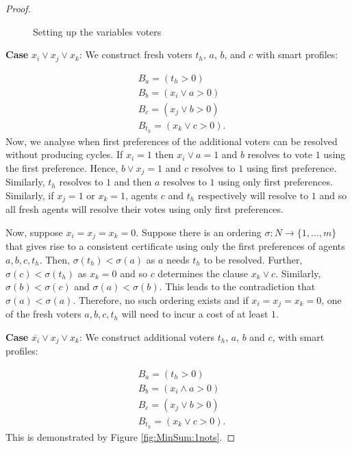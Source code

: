 \documentclass[11pt,a4paper, titlepage]{article}
\theoremstyle{definition}
\begin{document}
\begin{proof}
\begin{figure}
{
    }
    \caption{Setting up the variables voters}
    \label{fig:votes}
\end{figure}

\textbf{Case} $x_i \lor x_j \lor x_k$: We construct fresh voters $t_h$, $a$, $b$, and $c$ with smart profiles:

\begin{align*}
    &B_a = (t_h > 0) \\
    &B_b = (x_i \lor a > 0) \\
    &B_c = (x_j \lor b > 0) \\
    &B_{t_h} = (x_k \lor c > 0).
\end{align*}
Now, we analyse when first preferences of the additional voters can be resolved without producing cycles. If $x_i = 1$ then $x_i \lor a = 1$ and $b$ resolves to vote $1$ using the first preference. 
Hence, $b \lor x_j = 1$ and $c$ resolves to $1$ using first preference. 
Similarly, $t_h$ resolves to $1$ and then $a$ resolves to $1$ using only first preferences. 
Similarly, if $x_j = 1$ or $x_k = 1$, agents $c$ and $t_h$ respectively will resolve to $1$ and so all fresh agents will resolve their votes using only first preferences.

Now, suppose $x_i = x_j = x_k = 0$. Suppose there is an ordering $\sigma \colon N \longrightarrow \{1,\ldots, m\}$ that gives rise to a consistent certificate using only the first preferences of agents $a, b, c, t_h$. Then, $\sigma(t_h) < \sigma(a)$ as $a$ needs $t_h$ to be resolved. Further, $\sigma(c) < \sigma(t_h)$ as $x_k = 0$ and so $c$ determines the clause $x_k \lor c$. Similarly, $\sigma(b) < \sigma(c)$ and $\sigma(a) < \sigma(b)$. This leads to the contradiction that $\sigma(a) < \sigma(a)$. Therefore, no such ordering exists and if $x_i = x_j = x_k = 0$, one of the fresh voters $a, b, c, t_h$ will need to incur a cost of at least $1$.

\textbf{Case} $\overline{x_i} \lor x_j \lor x_k$: We construct additional voters $t_h$, $a$, $b$ and $c$, with smart profiles:

\begin{align*}
    &B_a = (t_h > 0) \\
    &B_b = (x_i \land a > 0) \\
    &B_c = (x_j \lor b > 0) \\
    &B_{t_h} = (x_k \lor c > 0).
\end{align*}
This is demonstrated by Figure \ref{fig:MinSum:1nots}.


\end{proof}
\end{document}
